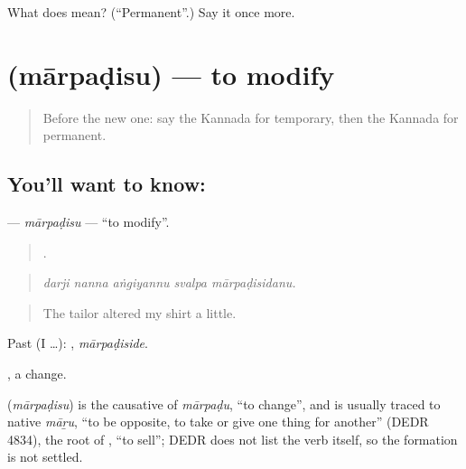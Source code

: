 \begin{tcolorbox}[breakable,colback=teal!4,colframe=teal!35!black,title={Before you move on}]
What does  mean? (\textquotedblleft{}Permanent\textquotedblright{}.) Say it once more.
\end{tcolorbox}
\section[\texorpdfstring{\kn{ಮಾರ್ಪಡಿಸು} (mārpaḍisu)}{ಮಾರ್ಪಡಿಸು (mārpaḍisu)}]{ (mārpaḍisu) — to modify}

\label{lesson:KA-C418-marpadisu}



\begin{quote}
Before the new one: say the Kannada for temporary, then the Kannada for permanent.
\end{quote}

\subsection*{You'll want to know: }
\textbf{} — \emph{mārpaḍisu} — \textquotedblleft{}to modify\textquotedblright{}.

\begin{quote}
    .
\end{quote}

\begin{quote}
\emph{darji nanna aṅgiyannu svalpa mārpaḍisidanu.}
\end{quote}

\begin{quote}
The tailor altered my shirt a little.
\end{quote}

Past (I …): , \emph{mārpaḍiside}.

, a change.

\begin{cousinweb}
\textbf{} (\emph{mārpaḍisu}) is the causative of \emph{mārpaḍu}, \textquotedblleft{}to change\textquotedblright{}, and is usually traced to native \emph{māṟu}, \textquotedblleft{}to be opposite, to take or give one thing for another\textquotedblright{} (DEDR 4834), the root of , \textquotedblleft{}to sell\textquotedblright{}; DEDR does not list the verb itself, so the formation is not settled.
\end{cousinweb}

